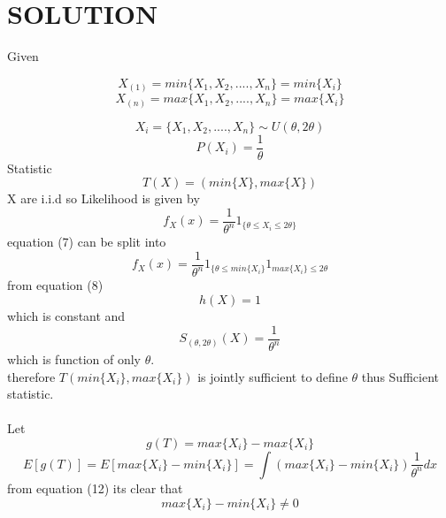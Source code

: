 \documentclass[journal,12pt,twocolumn]{IEEEtran}
\begin{document}
\section{\textbf{SOLUTION}}
Given

\begin{equation}
      X_{(1)} =min\{X_1,X_2,....,X_n\}=min\{X_i\}
\end{equation}
\begin{equation}
    X_{(n)}=max\{X_1,X_2,....,X_n\}=max\{X_i\}
\end{equation}

\begin{equation}
    X_i=\{X_1,X_2,....,X_n\}\sim U(\theta,2\theta)
\end{equation}
\begin{equation}
    P(X_i)=\dfrac{1}{\theta}
\end{equation}
Statistic
\begin{equation}
    T(X)=(min\{X\},max\{X\})
\end{equation}
X are i.i.d so Likelihood is given by 
\begin{equation}
    f_X(x)=\frac{1}{\theta^n}1_{\{\theta\leq X_i \leq2\theta\}}
\end{equation}
equation (7) can be split into
\begin{equation}
    f_X(x)=\frac{1}{\theta^n}1_{\{\theta\leq min\{X_i\}}1_{max\{ X_i\}\leq2\theta}
\end{equation}
from equation (8) 
\begin{equation}
    h(X)=1
\end{equation}
 which is constant and
\begin{equation}
    S_{(\theta,2\theta)}(X)=\frac{1}{\theta^n}
\end{equation}
 which is function of only $\theta$.\\
therefore $T(min\{X_i\},max\{X_i\})$ is jointly sufficient to define $\theta$ thus Sufficient statistic.\\ \\
Let 
\begin{equation}
     g(T)=max\{X_i\}-max\{X_i\}
\end{equation}
\begin{equation}
    E[g(T)]=E[max\{X_i\}-min\{X_i\}]=\int (max\{X_i\}-min\{X_i\})\frac{1}{\theta^n}dx
\end{equation}
from equation (12) its clear that
\begin{equation}
    max\{X_i\}-min\{X_i\}\neq0
\end{equation}
\end{document}
